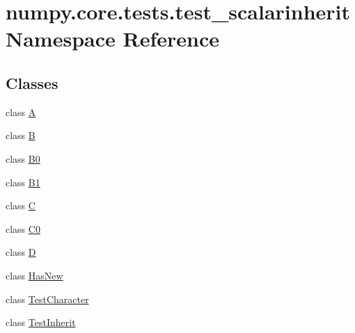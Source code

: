 \hypertarget{namespacenumpy_1_1core_1_1tests_1_1test__scalarinherit}{}\section{numpy.\+core.\+tests.\+test\+\_\+scalarinherit Namespace Reference}
\label{namespacenumpy_1_1core_1_1tests_1_1test__scalarinherit}
\subsection*{Classes}
\begin{DoxyCompactItemize}
\item 
class \hyperlink{classnumpy_1_1core_1_1tests_1_1test__scalarinherit_1_1A}{A}
\item 
class \hyperlink{classnumpy_1_1core_1_1tests_1_1test__scalarinherit_1_1B}{B}
\item 
class \hyperlink{classnumpy_1_1core_1_1tests_1_1test__scalarinherit_1_1B0}{B0}
\item 
class \hyperlink{classnumpy_1_1core_1_1tests_1_1test__scalarinherit_1_1B1}{B1}
\item 
class \hyperlink{classnumpy_1_1core_1_1tests_1_1test__scalarinherit_1_1C}{C}
\item 
class \hyperlink{classnumpy_1_1core_1_1tests_1_1test__scalarinherit_1_1C0}{C0}
\item 
class \hyperlink{classnumpy_1_1core_1_1tests_1_1test__scalarinherit_1_1D}{D}
\item 
class \hyperlink{classnumpy_1_1core_1_1tests_1_1test__scalarinherit_1_1HasNew}{Has\+New}
\item 
class \hyperlink{classnumpy_1_1core_1_1tests_1_1test__scalarinherit_1_1TestCharacter}{Test\+Character}
\item 
class \hyperlink{classnumpy_1_1core_1_1tests_1_1test__scalarinherit_1_1TestInherit}{Test\+Inherit}
\end{DoxyCompactItemize}
